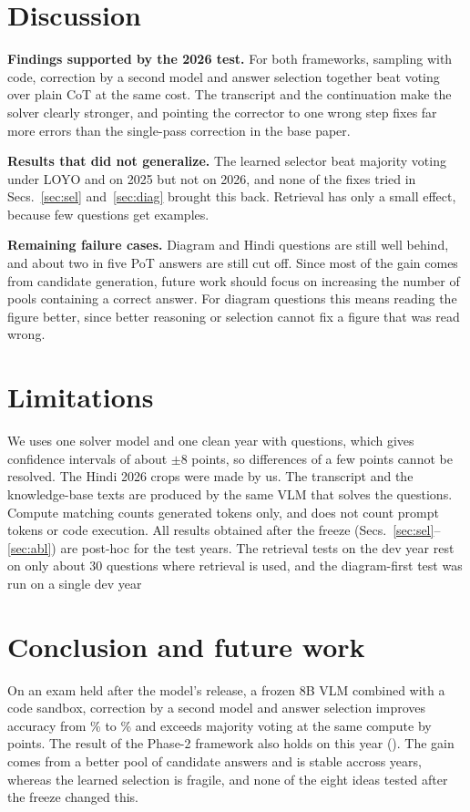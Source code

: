 \documentclass[conference]{IEEEtran}
\begin{document}
\section{Discussion}
\textbf{Findings supported by the 2026 test.} For both frameworks, sampling with code, correction by a
second model and answer selection together beat voting over plain CoT at the same cost. The
transcript and the continuation make the solver clearly stronger, and pointing the corrector to
one wrong step fixes far more errors than the single-pass correction in the base paper.

\textbf{Results that did not generalize.} The learned selector beat majority voting under LOYO and on 2025 but
not on 2026, and none of the fixes tried in Secs.~\ref{sec:sel} and~\ref{sec:diag} brought this
back. Retrieval has only a small effect, because few questions get examples.

\textbf{Remaining failure cases.} Diagram and Hindi questions are still well behind, and about two in
five PoT answers are still cut off. Since most of the gain comes from candidate generation, future work should focus on increasing the number of pools containing a correct answer. For diagram questions this means reading the figure better,
since better reasoning or selection cannot fix a figure that was read wrong.

\section{Limitations}
We uses one solver model and one clean year with \NTest{} questions, which gives confidence
intervals of about $\pm$8 points, so differences of a few points cannot be resolved. The Hindi
2026 crops were made by us. The transcript and the knowledge-base texts are produced by the same
VLM that solves the questions. Compute matching counts generated tokens only, and does not count
prompt tokens or code execution. All results obtained after the freeze
(Secs.~\ref{sec:sel}--\ref{sec:abl}) are post-hoc for the test years. The retrieval tests on the
dev year rest on only about 30 questions where retrieval is used, and the diagram-first test was
run on a single dev year

\section{Conclusion and future work}
On an exam held after the model's release, a frozen 8B VLM combined with a code sandbox,
correction by a second model and answer selection improves accuracy from \ThreeBase\% to
\ThreeAcc\% and exceeds majority voting at the same compute by \ThreeVsSc{} points. The result of
the Phase-2 framework also holds on this year (\TwoVsSc). The gain comes from a better pool of
candidate answers and is stable accross years, whereas the learned selection is fragile, and
none of the eight ideas tested after the freeze changed this.
\end{document}
